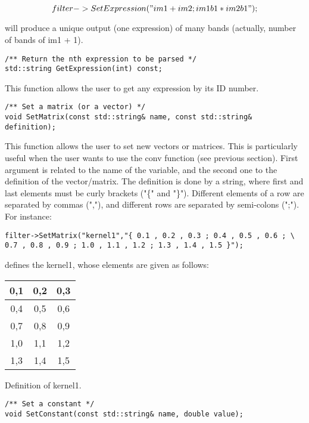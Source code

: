 \begin{equation}
	filter->SetExpression("im1 + im2 ; im1b1*im2b1");
\end{equation}

will produce a unique output (one expression) of many bands (actually, number of bands of im1 + 1).

\begin{verbatim}
/** Return the nth expression to be parsed */
std::string GetExpression(int) const;
\end{verbatim}

This function allows the user to get any expression by its ID number.

\begin{verbatim}
/** Set a matrix (or a vector) */
void SetMatrix(const std::string& name, const std::string& definition);
\end{verbatim}

This function allows the user to set new vectors or matrices. This is particularly useful when the user wants to use the conv function (see previous section). First argument is related to the name of the variable, and the second one to the definition of the vector/matrix. The definition is done by a string, where first and last elements must be curly brackets ("\{" and "\}"). Different elements of a row are separated by commas (","), and different rows are separated by semi-colons (";"). For instance:

\begin{verbatim}
filter->SetMatrix("kernel1","{ 0.1 , 0.2 , 0.3 ; 0.4 , 0.5 , 0.6 ; \
0.7 , 0.8 , 0.9 ; 1.0 , 1.1 , 1.2 ; 1.3 , 1.4 , 1.5 }");
\end{verbatim}

defines the kernel1, whose elements are given as follows:

\begin{center} 
\begin{tabular}{|c|c|c|}
\hline
0,1	& 0,2	& 0,3 \\
\hline
0,4 &	0,5	& 0,6 \\
\hline
0,7 &	0,8	& 0,9 \\
\hline
1,0	& 1,1	& 1,2 \\
\hline
1,3	& 1,4	& 1,5 \\
\hline
\end{tabular}
\end{center}
\caption{Definition of kernel1.}
\label{correctness}

\begin{verbatim}
/** Set a constant */
void SetConstant(const std::string& name, double value);
\end{verbatim}

